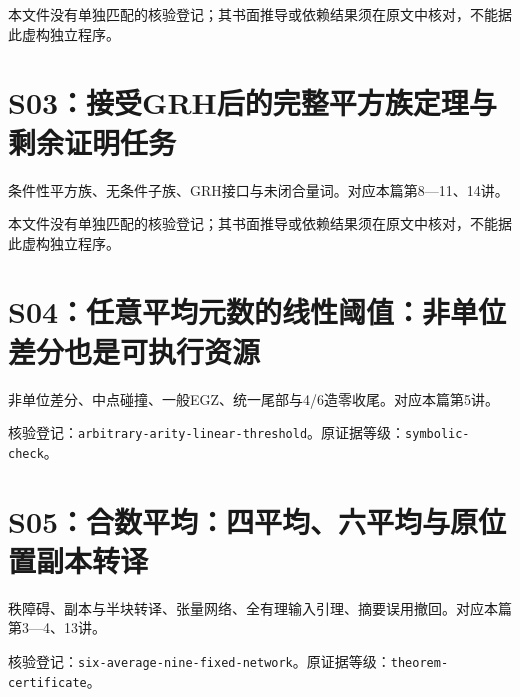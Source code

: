 \par{}\par

本文件没有单独匹配的核验登记；其书面推导或依赖结果须在原文中核对，不能据此虚构独立程序。

\section{S03：接受GRH后的完整平方族定理与剩余证明任务}\label{source:S03}

条件性平方族、无条件子族、GRH接口与未闭合量词。对应本篇第8—11、14讲。

\par{}\par

本文件没有单独匹配的核验登记；其书面推导或依赖结果须在原文中核对，不能据此虚构独立程序。

\section{S04：任意平均元数的线性阈值：非单位差分也是可执行资源}\label{source:S04}

非单位差分、中点碰撞、一般EGZ、统一尾部与4/6造零收尾。对应本篇第5讲。

\par{}\par

核验登记：{\small\nolinkurl{arbitrary-arity-linear-threshold}}。原证据等级：{\small\nolinkurl{symbolic-check}}。

\section{S05：合数平均：四平均、六平均与原位置副本转译}\label{source:S05}

秩障碍、副本与半块转译、张量网络、全有理输入引理、摘要误用撤回。对应本篇第3—4、13讲。

\par{}\par

核验登记：{\small\nolinkurl{six-average-nine-fixed-network}}。原证据等级：{\small\nolinkurl{theorem-certificate}}。

